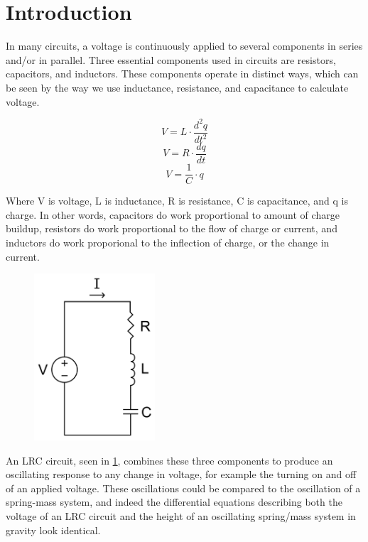 \documentclass[aps,prl,reprint]{revtex4-2}
\begin{document}
\maketitle

\section{Introduction}
In many circuits, a voltage is continuously applied to several components in series 
and/or in parallel. Three essential components used in circuits are resistors, 
capacitors, and inductors. These components operate in distinct ways, which can be
seen by the way we use inductance, resistance, and capacitance to calculate voltage.

$$ V = L \cdot \frac{d^2q}{dt^2} $$
$$ V = R \cdot \frac{dq}{dt} $$
$$ V = \frac{1}{C} \cdot q $$

Where V is voltage, L is inductance, R is resistance, C is capacitance, and q is 
charge. In other words, capacitors do work proportional to amount of charge buildup, 
resistors do work proportional to the flow of charge or current, and inductors do 
work proporional to the inflection of charge, or the change in current. \\

\begin{figure}[h]
\includegraphics[width=0.4\textwidth]{../Images/l6_LRC.png}
\caption{\label{figA}}
\end{figure}

An LRC circuit, seen in \ref{figA}, combines these three components to produce an 
oscillating response
to any change in voltage, for example the turning on and off of an applied voltage.
These oscillations could be compared to the oscillation of a spring-mass system,
and indeed the differential equations describing both the voltage of an LRC circuit
and the height of an oscillating spring/mass system in gravity look identical. \\
\end{document}
